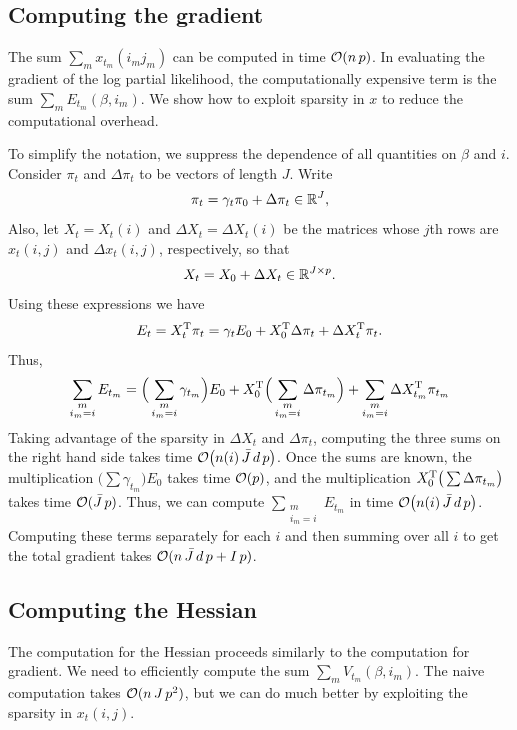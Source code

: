 \documentclass[final]{statsoc}
\begin{document}
\subsection{Computing the gradient}

The sum $\sum_m x_{t_m}(i_m j_m)$ can be computed in time $\mathcal{O}(n \, p)$.
In evaluating the gradient of the log partial likelihood, the computationally
expensive term is the sum
\(
   \sum_{m} E_{t_m}(\beta, i_m).
\)
We show how to exploit sparsity in $x$ to reduce the computational overhead.

To simplify the notation, we suppress the dependence of all quantities on $\beta$ and $i$.
Consider $\pi_t$ and $\Delta \pi_t$ to be vectors of length $J$.  Write
\[
    \pi_t = \gamma_t \pi_0 + \Delta \pi_t \in \mathbb{R}^J,
\]
Also, let $X_t = X_t(i)$ and $\Delta X_t = \Delta X_t(i)$ be the matrices
whose $j$th rows are $x_t(i,j)$ and $\Delta x_t(i,j)$, respectively, so
that
\[
  X_t = X_0 + \Delta X_t \in \mathbb{R}^{J \times p}.
\]
Using these expressions we have
\[
  E_t = X_t^{\mathrm{T}} \pi_t
      = \gamma_t E_0
      + X_0^{\mathrm{T}} \Delta \pi_t
      + \Delta X_t^{\mathrm{T}} \pi_t.
\]
Thus,
\[
  \sum_{\substack{m  \\ i_m = i}} E_{t_m} =
    \Big(\sum_{\substack{ m \\ i_m = i}} \gamma_{t_m}\Big) E_0
    +
    X_0^{\mathrm{T}} \Big(\sum_{\substack{ m \\ i_m = i }} \Delta \pi_{t_m}\Big)
    +
    \sum_{\substack{m \\ i_m = i}} \Delta X_{t_m}^{\mathrm{T}} \pi_{t_m}
\]
Taking advantage of the sparsity in $\Delta X_t$ and $\Delta \pi_t$, computing
the three sums on the right hand side takes time $\mathcal{O}\big(n(i) \,
\bar J \, d \, p\big)$.  Once the sums are known, the multiplication
$\Big(\sum \gamma_{t_m}\Big) E_0$ takes time $\mathcal{O}(p)$, and the
multiplication $X_0^{\mathrm{T}} \big( \sum \Delta \pi_{t_m}\big)$ takes time
$\mathcal{O}(\bar J \, p)$.  Thus, we can compute $\sum_{\substack{m \\ i_m = i}} E_{t_m}$ in time
$\mathcal{O}\big(n(i) \, \bar J \, d \, p\big)$.  Computing these terms separately for
each $i$ and then summing over all $i$ to get the total gradient takes $\mathcal{O}(n
\, \bar J \, d \, p + I \, p)$.


\subsection{Computing the Hessian}

The computation for the Hessian proceeds similarly to the computation for
gradient.  We need to efficiently compute the sum $\sum_m V_{t_m}(\beta,
i_m)$.  The naive computation takes $\mathcal{O}(n \, J \, p^2)$, but we can do much
better by exploiting the sparsity in $x_t(i,j)$.
\end{document}
